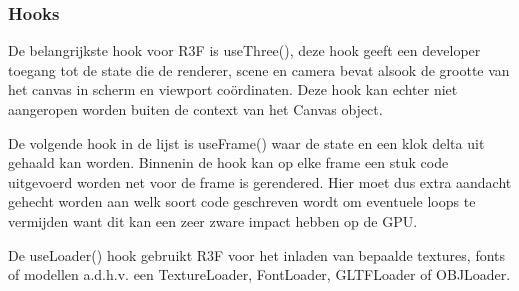 \subsubsection{Hooks}

De belangrijkste hook voor R3F is useThree(), deze hook geeft een developer toegang tot de state die de renderer, scene en camera bevat alsook de grootte van het canvas in scherm en viewport coördinaten. Deze hook kan echter niet aangeropen worden buiten de context van het Canvas object.

De volgende hook in de lijst is useFrame() waar de state en een klok delta uit gehaald kan worden. Binnenin de hook kan op elke frame een stuk code uitgevoerd worden net voor de frame is gerendered. Hier moet dus extra aandacht gehecht worden aan welk soort code geschreven wordt om eventuele loops te vermijden want dit kan een zeer zware impact hebben op de GPU.

De useLoader() hook gebruikt R3F voor het inladen van bepaalde textures, fonts of modellen a.d.h.v. een TextureLoader, FontLoader, GLTFLoader of OBJLoader.
